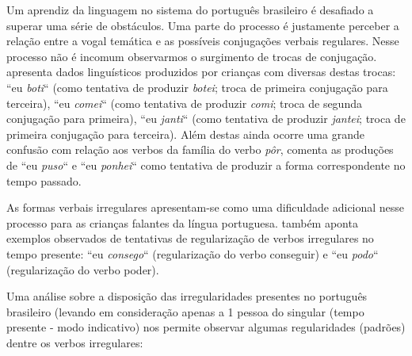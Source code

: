 Um aprendiz da linguagem no sistema do português brasileiro é desafiado a superar uma série de obstáculos.  Uma parte do processo é justamente perceber a relação entre a vogal temática e as possíveis conjugações verbais regulares. Nesse processo não é incomum observarmos o surgimento de trocas de conjugação. \cite{wuerges:2014} apresenta dados linguísticos produzidos por crianças com diversas destas trocas: “eu \textit{boti}“ (como tentativa de produzir \textit{botei}; troca de primeira conjugação para terceira), “eu \textit{comei}“ (como tentativa de produzir \textit{comi}; troca de segunda conjugação para primeira), “eu \textit{janti}“ (como tentativa de produzir \textit{jantei}; troca de primeira conjugação para terceira). Além destas ainda ocorre uma grande confusão com relação aos verbos da família do verbo \textit{pôr}, \cite{wuerges:2014} comenta as produções de “eu \textit{puso}“ e “eu \textit{ponhei}“ como tentativa de produzir a forma correspondente no tempo passado.  

As formas verbais irregulares apresentam-se como uma dificuldade adicional nesse processo para as crianças falantes da língua portuguesa. \cite{wuerges:2014} também aponta exemplos observados de tentativas de regularização de verbos irregulares no tempo presente: “eu \textit{consego}“ (regularização do verbo conseguir) e “eu \textit{podo}“ (regularização do verbo poder). 


Uma análise sobre a disposição das irregularidades presentes no português brasileiro (levando em consideração apenas a 1 pessoa do singular (tempo presente - modo indicativo) nos permite observar algumas regularidades (padrões) dentre os verbos irregulares:\\

